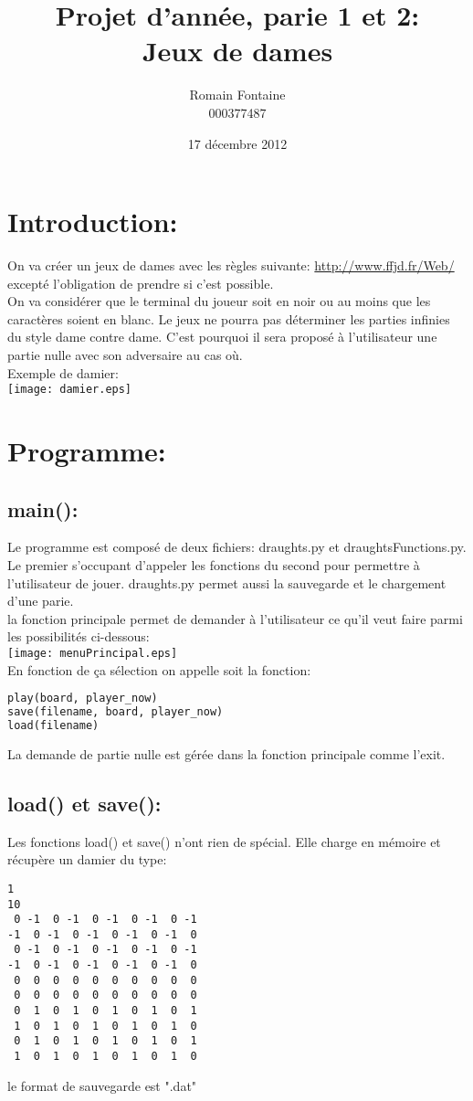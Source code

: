 \documentclass[10pt,a4paper]{report}
\author{Romain Fontaine\\000377487}
\title{Projet d'année, parie 1 et 2:\\Jeux de dames}
\date{17 décembre 2012}
\begin{document}
\maketitle


\chapter*{Introduction:}
On va créer un jeux de dames avec les règles suivante: \url{http://www.ffjd.fr/Web/} excepté l'obligation de prendre si c'est possible.\\
On va considérer que le terminal du joueur soit en noir ou au moins que les caractères soient en blanc. Le jeux ne pourra pas déterminer les parties infinies du style dame contre dame. C'est pourquoi il sera proposé à l'utilisateur une partie nulle avec son adversaire au cas où.\\
Exemple de damier:\\
\texttt{[image: damier.eps]}\\


\chapter*{Programme:}
\section*{main():}
Le programme est composé de deux fichiers: draughts.py et draughtsFunctions.py. Le premier s'occupant d'appeler les fonctions du second pour permettre à l'utilisateur de jouer. draughts.py permet aussi la sauvegarde et le chargement d'une parie.\\
la fonction principale permet de demander à l'utilisateur ce qu'il veut faire parmi les possibilités ci-dessous:\\
\texttt{[image: menuPrincipal.eps]}\\
En fonction de ça sélection on appelle soit la fonction:
\begin{lstlisting}[language=Python]
play(board, player_now)
save(filename, board, player_now)
load(filename)
\end{lstlisting}
La demande de partie nulle est gérée dans la fonction principale comme l'exit.

\section*{load() et save():}
Les fonctions load() et save() n'ont rien de spécial. Elle charge en mémoire et récupère un damier du type:
\begin{lstlisting}
1
10
 0 -1  0 -1  0 -1  0 -1  0 -1 
-1  0 -1  0 -1  0 -1  0 -1  0 
 0 -1  0 -1  0 -1  0 -1  0 -1 
-1  0 -1  0 -1  0 -1  0 -1  0 
 0  0  0  0  0  0  0  0  0  0 
 0  0  0  0  0  0  0  0  0  0 
 0  1  0  1  0  1  0  1  0  1 
 1  0  1  0  1  0  1  0  1  0 
 0  1  0  1  0  1  0  1  0  1 
 1  0  1  0  1  0  1  0  1  0 
\end{lstlisting}
le format de sauvegarde est ".dat"
\end{document}
